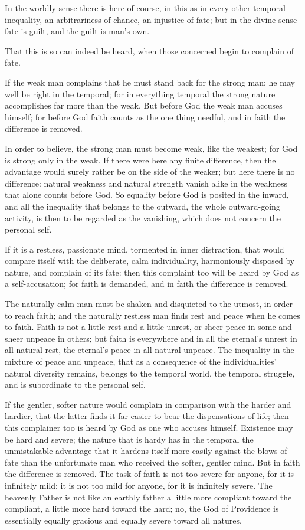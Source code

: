 \documentclass[12pt,a4paper,openany]{book}
\newcommand{\opage}[1]{\marginnote{\footnotesize\textit{[#1]}}}
\begin{document}
In the worldly sense there is here of course, in
this as in every other temporal inequality, an
arbitrariness of chance, an injustice of fate;
but in the divine sense
fate is guilt, and the guilt is man's
own.

That this is so can indeed be
heard, when those concerned begin to complain
of fate.

If the weak man complains that he must stand back
for the strong man; he may well be right
in the temporal; for in everything temporal the
strong nature accomplishes far more than the weak. But
before God the weak man accuses himself; for before
God faith counts as the one thing needful, and
in faith the difference is removed.

In order to believe, the strong man must become weak,
like the weakest; for God is strong only in the
weak. If there were here any finite difference,
then the advantage would surely rather be on
\setcounter{footnote}{0}%
\opage{79}the side of the weaker; but here there is no difference:
natural weakness and natural
strength vanish alike in the weakness that
alone counts before God. So equality before
God is posited in the inward, and all the inequality that belongs
to the outward, the whole outward-going activity,
is then to be regarded as the vanishing,
which does not concern the personal self.

If it is a restless, passionate mind, tormented in inner
distraction, that would compare
itself with the deliberate, calm individuality, harmoniously
disposed by nature, and complain
of its fate: then this complaint too will be
heard by God as a self-accusation; for faith
is demanded, and in faith the difference is removed.

The naturally calm man must be shaken and disquieted
to the utmost, in order to reach faith; and
the naturally restless man finds rest and peace
when he comes to faith. Faith is not
a little rest and a little unrest, or sheer peace in some
and sheer unpeace in others; but faith is everywhere
and in all the eternal's unrest in all natural rest,
the eternal's peace in all natural unpeace. The
inequality in the mixture of peace and unpeace, that
as a consequence of the individualities' 
\setcounter{footnote}{0}%
\opage{80}natural diversity remains, belongs to the temporal
world, the temporal struggle, and is subordinate to the personal
self.

If the gentler, softer nature would complain
in comparison with the harder and hardier, that the latter
finds it far easier to bear
the dispensations of life; then this complainer too is heard
by God as one who accuses himself.
Existence may be hard and severe; the nature
that is hardy has in the temporal the
unmistakable advantage that it hardens itself more easily
against the blows of fate than the unfortunate man
who received the softer, gentler mind. But in faith
the difference is removed. The task of faith is not too
severe for anyone, for it is infinitely mild; it
is not too mild for anyone, for it is infinitely severe.
The heavenly Father is not like an earthly
father a little more compliant toward the compliant, a little
more hard toward the hard; no, the God
of Providence is essentially equally gracious and equally severe
toward all natures.
\end{document}
